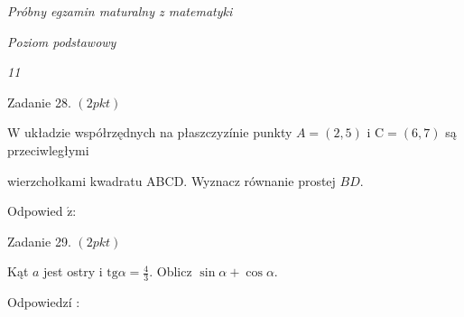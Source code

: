 \documentclass[a4paper,12pt]{article}
\begin{document}
{\it Próbny egzamin maturalny z matematyki}

{\it Poziom podstawowy}

{\it 11}

Zadanie 28. $(2pkt)$

$\mathrm{W}$ układzie współrzędnych na płaszczyzínie punkty $A=(2,5)$ i $\mathrm{C}=(6,7)$ są przeciwległymi

wierzchołkami kwadratu ABCD. Wyznacz równanie prostej $BD.$

Odpowied $\acute{\mathrm{z}}$:

Zadanie 29. $(2pkt)$

Kąt $a$ jest ostry i $\displaystyle \mathrm{t}\mathrm{g}\alpha=\frac{4}{3}$. Oblicz $\sin\alpha+\cos\alpha.$

Odpowiedzí :
\end{document}
